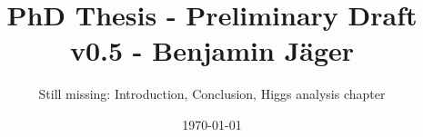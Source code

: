 

\endofdump


% 

\newif\ifIMAGES
\IMAGEStrue




\author{Still missing: Introduction, Conclusion, Higgs analysis chapter}
\date{\today}
\title{PhD Thesis - Preliminary Draft v0.5 - Benjamin Jäger}




\maketitle





\tableofcontents


\newcommand{\chapterdir}{chapters}
%

% 

% 

% 

